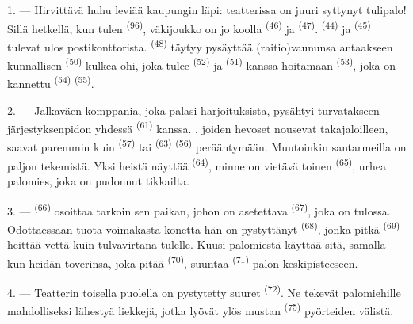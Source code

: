 1. --- Hirvittävä huhu leviää kaupungin läpi: teatterissa on juuri syttynyt
tulipalo! Sillä hetkellä, kun tulen  \textsuperscript{(96)},
väkijoukko on jo koolla  \textsuperscript{(46)} ja
 \textsuperscript{(47)}. 
\textsuperscript{(44)} ja  \textsuperscript{(45)} tulevat
ulos postikonttorista.  \textsuperscript{(48)}
täytyy pysäyttää (raitio)vaununsa antaakseen kunnallisen
 \textsuperscript{(50)} kulkea ohi, joka tulee
 \textsuperscript{(52)} ja 
\textsuperscript{(51)} kanssa hoitamaan 
\textsuperscript{(53)}, joka on kannettu 
\textsuperscript{(54)}  \textsuperscript{(55)}.

2. --- Jalkaväen komppania, joka palasi harjoituksista, pysähtyi turvatakseen
järjestyksenpidon yhdessä 
\textsuperscript{(61)} kanssa. , joiden hevoset nousevat
takajaloilleen, saavat paremmin kuin  \textsuperscript{(57)}
tai  \textsuperscript{(63)} 
\textsuperscript{(56)} perääntymään. Muutoinkin santarmeilla on paljon tekemistä.
Yksi heistä näyttää  \textsuperscript{(64)},
minne on vietävä toinen  \textsuperscript{(65)}, urhea
palomies, joka on pudonnut tikkailta.

3. ---  \textsuperscript{(66)} osoittaa tarkoin sen paikan, johon
on asetettava  \textsuperscript{(67)}, joka on tulossa.
Odottaessaan tuota voimakasta konetta hän on pystyttänyt 
\textsuperscript{(68)}, jonka pitkä  \textsuperscript{(69)}
heittää vettä kuin tulvavirtana tulelle. Kuusi palomiestä käyttää sitä, samalla
kun heidän toverinsa, joka pitää  \textsuperscript{(70)},
suuntaa  \textsuperscript{(71)} palon keskipisteeseen.

4. --- Teatterin toisella puolella on pystytetty suuret 
\textsuperscript{(72)}. Ne tekevät palomiehille mahdolliseksi lähestyä liekkejä,
jotka lyövät ylös mustan  \textsuperscript{(75)} pyörteiden
välistä.

\VUsaut{5.0mm}
\VUsaut{3.4mm}

